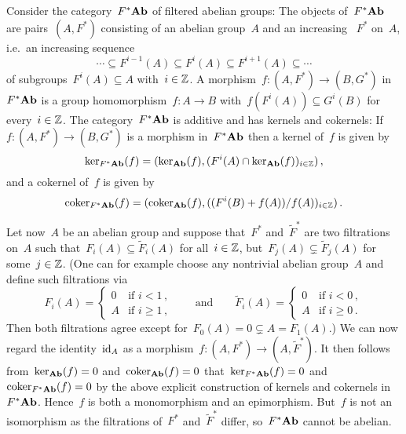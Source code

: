 \begin{example}
  Consider the category~$F^* \mathbf{Ab}$ of filtered abelian groups:
  The objects of~$F^* \mathbf{Ab}$ are pairs~$(A,F^*)$ consisting of an abelian group~$A$ and an increasing ~$F^*$ on~$A$, i.e.\ an increasing sequence
  \[
              \dotsb
    \subseteq F^{i-1}(A)
    \subseteq F^i(A)
    \subseteq F^{i+1}(A)
    \subseteq \dotsb
  \]
  of subgroups~$F^i(A) \subseteq A$ with~$i \in \mathbb{Z}$.
  A morphism~$f \colon (A, F^*) \to (B,G^*)$ in~$F^* \mathbf{Ab}$ is a group homomorphism~$f \colon A \to B$ with~$f(F^i(A)) \subseteq G^i(B)$ for every~$i \in \mathbb{Z}$.
  The category~$F^* \mathbf{Ab}$ is additive and has kernels and cokernels:
  If~$f \colon (A,F^*) \to (B,G^*)$ is a morphism in~$F^* \mathbf{Ab}$ then a kernel of~$f$ is given by
  \[
      \ker_{F^* \mathbf{Ab}}(f)
    = ( \ker_{\mathbf{Ab}}(f), ( F^i(A) \cap \ker_{\mathbf{Ab}}(f) )_{i \in \mathbb{Z}} ) \,,
  \]
  and a cokernel of~$f$ is given by
  \[
      \operatorname{coker}_{F^* \mathbf{Ab}}(f)
    = ( \operatorname{coker}_{\mathbf{Ab}}(f), ( (F^i(B) + f(A))/f(A) )_{i \in \mathbb{Z}} ) \,.
  \]
  
  Let now~$A$ be an abelian group and suppose that~$F^*$ and~$\tilde{F}^*$ are two filtrations on~$A$ such that~$F_i(A) \subseteq \tilde{F}_i(A)$ for all~$i \in \mathbb{Z}$, but~$F_j(A) \subsetneq \tilde{F}_j(A)$ for some~$j \in \mathbb{Z}$.
  (One can for example choose any nontrivial abelian group~$A$ and define such filtrations via
  \[
      F_i(A)
    = \begin{cases}
        0 & \text{if~$i < 1$} \,, \\
        A & \text{if~$i \geq 1$}  \,,
      \end{cases}
    \qquad\text{and}\qquad
      \tilde{F}_i(A)
    = \begin{cases}
        0 & \text{if~$i < 0$} \,, \\
        A & \text{if~$i \geq 0$}  \,.
      \end{cases}
  \]
  Then both filtrations agree except for~$F_0(A) = 0 \subsetneq A = F_1(A)$.)
  We can now regard the identity~$\operatorname{id}_A$ as a morphism~$f \colon (A, F^*) \to (A, \tilde{F}^*)$.
  It then follows from~$\ker_{\mathbf{Ab}}(f) = 0$ and~$\operatorname{coker}_{\mathbf{Ab}}(f) = 0$ that~$\ker_{F^* \mathbf{Ab}}(f) = 0$ and~$\operatorname{coker}_{F^* \mathbf{Ab}}(f) = 0$ by the above explicit construction of kernels and cokernels in~$F^* \mathbf{Ab}$.
  Hence~$f$ is both a monomorphism and an epimorphism.
  But~$f$ is not an isomorphism as the filtrations of~$F^*$ and~$\tilde{F}^*$ differ, so~$F^* \mathbf{Ab}$ cannot be abelian.
\end{example}





